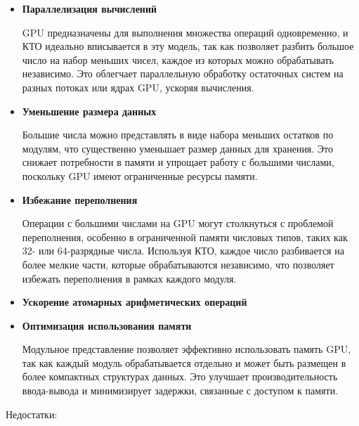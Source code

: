 \documentclass[10pt]{article}
\begin{document}
\begin{itemize}
	\item \textbf{Параллелизация вычислений} 
	
	GPU предназначены для выполнения множества операций одновременно, и КТО идеально вписывается в эту модель, так как позволяет разбить большое число на набор меньших чисел, каждое из которых можно обрабатывать независимо. Это облегчает параллельную обработку остаточных систем на разных потоках или ядрах GPU, ускоряя вычисления.

	\item \textbf{Уменьшение размера данных}
	
	Большие числа можно представлять в виде набора меньших остатков по модулям, что существенно уменьшает размер данных для хранения. Это снижает потребности в памяти и упрощает работу с большими числами, поскольку GPU имеют ограниченные ресурсы памяти.

	\item \textbf{Избежание переполнения}
	
	Операции с большими числами на GPU могут столкнуться с проблемой переполнения, особенно в ограниченной памяти числовых типов, таких как 32- или 64-разрядные числа. Используя КТО, каждое число разбивается на более мелкие части, которые обрабатываются независимо, что позволяет избежать переполнения в рамках каждого модуля.

	\item \textbf{Ускорение атомарных арифметических операций}
	

	\item \textbf{Оптимизация использования памяти}
	
	Модульное представление позволяет эффективно использовать память GPU, так как каждый модуль обрабатывается отдельно и может быть размещен в более компактных структурах данных. Это улучшает производительность ввода-вывода и минимизирует задержки, связанные с доступом к памяти.

	
\end{itemize}

Недостатки:
\end{document}
